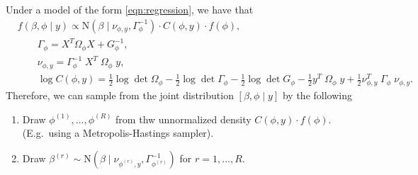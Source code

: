 \documentclass[10pt]{article}
\begin{document}
\begin{proposition}
\label{result:posterior}
Under a model of the form \eqref{eqn:regression}, we have that
%
\begin{align*}
&f(\beta, \phi \mid y) \propto \text{N}(\beta \mid \nu_{\phi, y}, \Gamma_\phi^{-1}) \cdot C(\phi, y) \cdot f(\phi), \\
&\qquad \Gamma_\phi = X^T \Omega_\phi X + G_\phi^{-1}, \\
&\qquad \nu_{\phi, y} = \Gamma_\phi^{-1} \; X^T \; \Omega_\phi \; y, \\
&\qquad \log C(\phi, y) = \frac{1}{2} \log \det \Omega_\phi - \frac{1}{2} \log \det \Gamma_\phi - \frac{1}{2} \log \det G_\phi
-\frac{1}{2} y^T \; \Omega_\phi \; y + \frac{1}{2} \nu_{\phi, y}^T \; \Gamma_\phi \; \nu_{\phi, y}.
\end{align*}
%
Therefore, we can sample from the joint distribution $[\beta, \phi \mid y]$ by the following
\begin{enumerate}
\item Draw $\phi^{(1)}, \ldots, \phi^{(R)}$ from thw unnormalized density $C(\phi, y) \cdot f(\phi)$. (E.g.~using a Metropolis-Hastings sampler).
\item Draw $\beta^{(r)} \sim \text{N}(\beta \mid \nu_{\phi^{(r)}, y}, \Gamma_{\phi^{(r)}}^{-1})$ for $r = 1, \ldots, R$.
\end{enumerate}

\end{proposition}
\end{document}
